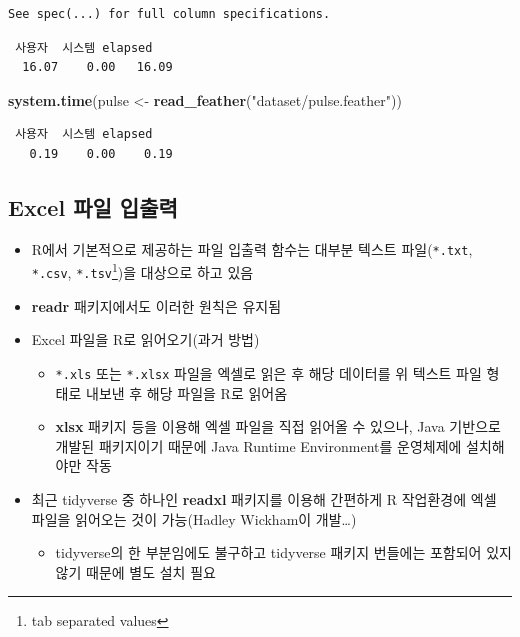 \documentclass[
  11pt,
]{krantz}
\newenvironment{Shaded}{\begin{snugshade}}{\end{snugshade}}
\newcommand{\KeywordTok}[1]{\textcolor[rgb]{0.27,0.27,0.27}{\textbf{#1}}}
\newcommand{\NormalTok}[1]{#1}
\newcommand{\StringTok}[1]{\textcolor[rgb]{0.5,0.5,0.5}{#1}}
\providecommand{\tightlist}{%
  \setlength{\itemsep}{0pt}\setlength{\parskip}{0pt}}
\begin{document}
\begin{verbatim}
See spec(...) for full column specifications.
\end{verbatim}

\begin{verbatim}
 사용자  시스템 elapsed 
  16.07    0.00   16.09 
\end{verbatim}

\begin{Shaded}
\begin{Highlighting}[]
\KeywordTok{system.time}\NormalTok{(pulse <-}\StringTok{ }\KeywordTok{read_feather}\NormalTok{(}\StringTok{"dataset/pulse.feather"}\NormalTok{))}
\end{Highlighting}
\end{Shaded}

\begin{verbatim}
 사용자  시스템 elapsed 
   0.19    0.00    0.19 
\end{verbatim}

\normalsize

\hypertarget{import-export-excel}{%
\subsection{Excel 파일 입출력}\label{import-export-excel}}

\begin{itemize}
\tightlist
\item
  R에서 기본적으로 제공하는 파일 입출력 함수는 대부분 텍스트 파일(\texttt{*.txt}, \texttt{*.csv}, \texttt{*.tsv}\footnote{tab separated values})을 대상으로 하고 있음
\item
  \textbf{readr} 패키지에서도 이러한 원칙은 유지됨
\item
  Excel 파일을 R로 읽어오기(과거 방법)

  \begin{itemize}
  \tightlist
  \item
    \texttt{*.xls} 또는 \texttt{*.xlsx} 파일을 엑셀로 읽은 후 해당 데이터를 위 텍스트 파일 형태로 내보낸 후 해당 파일을 R로 읽어옴
  \item
    \textbf{xlsx} 패키지 등을 이용해 엑셀 파일을 직접 읽어올 수 있으나, Java 기반으로 개발된 패키지이기 때문에 Java Runtime Environment를 운영체제에 설치해야만 작동
  \end{itemize}
\item
  최근 tidyverse 중 하나인 \textbf{readxl} 패키지를 이용해 간편하게 R 작업환경에 엑셀 파일을 읽어오는 것이 가능(Hadley Wickham이 개발\ldots)

  \begin{itemize}
  \tightlist
  \item
    tidyverse의 한 부분임에도 불구하고 tidyverse 패키지 번들에는 포함되어 있지 않기 때문에 별도 설치 필요
  \end{itemize}
\end{itemize}
\end{document}
